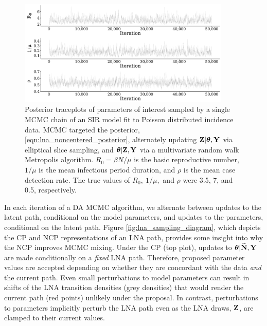 \begin{figure}[htbp]
	\centering
	\includegraphics[width=0.9\textwidth]{figures/lna_noncentered_traces}
	\caption[Traceplots for an MCMC chain using a non--centered LNA parameterization.]{Posterior traceplots of parameters of interest sampled by a single MCMC chain of an SIR model fit to Poisson distributed incidence data. MCMC targeted the posterior, \ref{eqn:lna_noncentered_posterior}, alternately updating $ \mathbf{Z}|\boldsymbol{\theta},\mathbf{Y} $ via elliptical slice sampling, and $ \boldsymbol{\theta}|\mathbf{Z},\mathbf{Y} $ via a multivariate random walk Metropolis algorithm. $ R_0 = \beta N / \mu$ is the basic reproductive number, $ 1/\mu $ is the mean infectious period duration, and $ \rho $ is the mean case detection rate. The true values of $ R_0,\ 1/\mu,$ and $ \rho $ were 3.5, 7, and 0.5, respectively.}
	\label{fig:lna_noncentered_traces}
\end{figure}

In each iteration of a DA MCMC algorithm, we alternate between updates to the latent path, conditional on the model parameters, and updates to the parameters, conditional on the latent path. Figure \ref{fig:lna_sampling_diagram}, which depicts the CP and NCP representations of an LNA path, provides some insight into why the NCP improves MCMC mixing. Under the CP (top plot), updates to $ \boldsymbol{\theta}|\widetilde{\mathbf{N}},\mathbf{Y} $ are made conditionally on a \textit{fixed} LNA path. Therefore, proposed parameter values are accepted depending on whether they are concordant with the data \textit{and} the current path. Even small perturbations to model parameters can result in shifts of the LNA transition densities (grey densities) that would render the current path (red points) unlikely under the proposal. In contrast, perturbations to parameters implicitly perturb the LNA path even as the LNA draws, $ \mathbf{Z} $, are clamped to their current values. 

